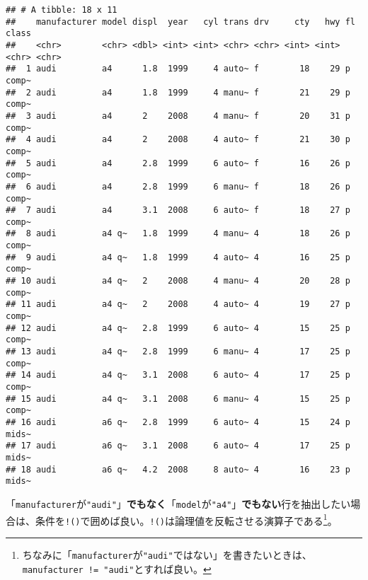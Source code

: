 \documentclass[]{book}
\newenvironment{Shaded}{\begin{snugshade}}{\end{snugshade}}
\newcommand{\KeywordTok}[1]{\textcolor[rgb]{0.13,0.29,0.53}{\textbf{#1}}}
\newcommand{\StringTok}[1]{\textcolor[rgb]{0.31,0.60,0.02}{#1}}
\newcommand{\OperatorTok}[1]{\textcolor[rgb]{0.81,0.36,0.00}{\textbf{#1}}}
\newcommand{\NormalTok}[1]{#1}
\let\rmarkdownfootnote\footnote%
\def\footnote{\protect\rmarkdownfootnote}
\begin{document}
\begin{verbatim}
## # A tibble: 18 x 11
##    manufacturer model displ  year   cyl trans drv     cty   hwy fl    class
##    <chr>        <chr> <dbl> <int> <int> <chr> <chr> <int> <int> <chr> <chr>
##  1 audi         a4      1.8  1999     4 auto~ f        18    29 p     comp~
##  2 audi         a4      1.8  1999     4 manu~ f        21    29 p     comp~
##  3 audi         a4      2    2008     4 manu~ f        20    31 p     comp~
##  4 audi         a4      2    2008     4 auto~ f        21    30 p     comp~
##  5 audi         a4      2.8  1999     6 auto~ f        16    26 p     comp~
##  6 audi         a4      2.8  1999     6 manu~ f        18    26 p     comp~
##  7 audi         a4      3.1  2008     6 auto~ f        18    27 p     comp~
##  8 audi         a4 q~   1.8  1999     4 manu~ 4        18    26 p     comp~
##  9 audi         a4 q~   1.8  1999     4 auto~ 4        16    25 p     comp~
## 10 audi         a4 q~   2    2008     4 manu~ 4        20    28 p     comp~
## 11 audi         a4 q~   2    2008     4 auto~ 4        19    27 p     comp~
## 12 audi         a4 q~   2.8  1999     6 auto~ 4        15    25 p     comp~
## 13 audi         a4 q~   2.8  1999     6 manu~ 4        17    25 p     comp~
## 14 audi         a4 q~   3.1  2008     6 auto~ 4        17    25 p     comp~
## 15 audi         a4 q~   3.1  2008     6 manu~ 4        15    25 p     comp~
## 16 audi         a6 q~   2.8  1999     6 auto~ 4        15    24 p     mids~
## 17 audi         a6 q~   3.1  2008     6 auto~ 4        17    25 p     mids~
## 18 audi         a6 q~   4.2  2008     8 auto~ 4        16    23 p     mids~
\end{verbatim}

「\texttt{manufacturer}が\texttt{"audi"}」\textbf{でもなく}「\texttt{model}が\texttt{"a4"}」\textbf{でもない}行を抽出したい場合は、条件を\texttt{!()}で囲めば良い。\texttt{!()}は論理値を反転させる演算子である\footnote{ちなみに「\texttt{manufacturer}が\texttt{"audi"}ではない」を書きたいときは、\texttt{manufacturer\ !=\ "audi"}とすれば良い。}。

\begin{Shaded}
\end{Shaded}
\end{document}
